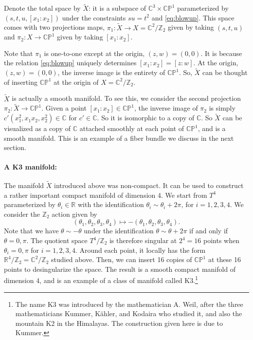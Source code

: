 \documentclass[12pt]{article}
\numberwithin{equation}{section}
\def\bC{\mathbb{C}}
\def\bR{\mathbb{R}}
\def\bZ{\mathbb{Z}}
\def\CP{\mathbb{CP}}
\begin{document}
Denote the total space by $\tilde X$: 
it is a subspace of $\bC^3\times \CP^1$ 
parameterized by 
$(s,t,u,[x_1:x_2])$ 
under the constraints $su=t^2$ and \eqref{eq:blowup}.
This space comes with two projections maps, $\pi_1:\tilde X\to X=\bC^2/\bZ_2$ 
given by taking $(s,t,u)$
and $\pi_2:X\to \CP^1$ given by taking $[x_1:x_2]$.

Note that $\pi_1$ is one-to-one except at the origin, $(z,w)=(0,0)$.
It is because the relation \eqref{eq:blowup} uniquely determines $[x_1:x_2]=[z:w]$.
At the origin, $(z,w)=(0,0)$, the inverse image is the entirety of $\CP^1$. 
So, $\tilde X$ can be thought of inserting  $\CP^1$ at the origin of $X=\bC^2/\bZ_2$.

$\tilde X$ is actually a smooth manifold.
To see this, we consider the second projection $\pi_2: \tilde X\to \CP^1$.
Given a point $[x_1:x_2]\in \CP^1$,
the inverse image of $\pi_2$ is simply $c'(x_1^2, x_1 x_2, x_2^2)\in \bC$
for $c'\in \bC$. 
So it is isomorphic to a copy of $\bC$.
So $\tilde X$ can be visualized as a copy of $\bC$ attached smoothly at each point of $\CP^1$,
and is a smooth manifold.
This is an example of a fiber bundle we discuss in the next section.

\paragraph{A K3 manifold:}

The manifold $\tilde X$ introduced above was non-compact. 
It can be used to construct a rather important compact manifold of dimension 4.
We start from $T^4$ parameterized by $\theta_i\in \bR$ with the identification $\theta_i\sim \theta_i+2\pi$, for $i=1,2,3,4$.
We consider the $\bZ_2$ action given by \begin{equation}
  (\theta_1,\theta_2,\theta_3,\theta_4) \mapsto -(\theta_1,\theta_2,\theta_3,\theta_4).
\end{equation}
Note that we have $\theta \sim -\theta$ under the identification $\theta\sim \theta+2\pi$ if and only if $\theta=0,\pi$.
The quotient space $T^4/\bZ_2$ is therefore singular at $2^4=16$ points
when $\theta_i = 0,\pi$ for $i=1,2,3,4$.
Around each point, it locally has the form $\bR^4/\bZ_2 = \bC^2/\bZ_2$ studied above.
Then, we can insert 16 copies of $\CP^1$ at these 16 points to desingularize the space.
The result is a smooth compact manifold of dimension 4, 
and is an example of a class of manifold called K3.\footnote{%
The name K3 was introduced by the mathematician A. Weil, after the three mathematicians 
Kummer, K\"ahler, and Kodaira who studied it, and also the mountain K2 in the Himalayas.
The construction given here is due to Kummer.
}
\end{document}
